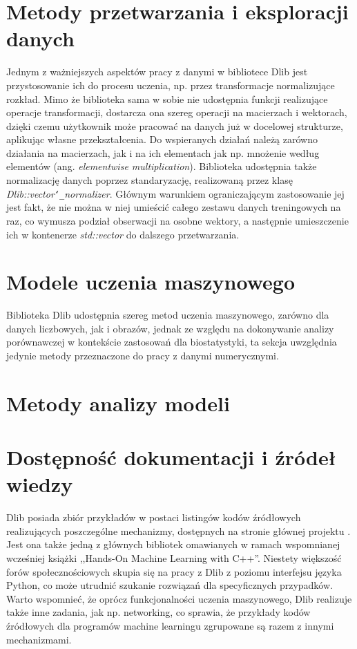 \section{Metody przetwarzania i eksploracji danych}

Jednym z ważniejszych aspektów pracy z danymi w bibliotece Dlib jest przystosowanie ich do procesu uczenia, np. przez transformacje normalizujące rozkład. Mimo że biblioteka sama w sobie nie udostępnia funkcji realizujące operacje transformacji, dostarcza ona szereg operacji na macierzach i wektorach, dzięki czemu użytkownik może pracować na danych już w docelowej strukturze, aplikując własne przekształcenia. Do wspieranych działań należą zarówno działania na macierzach, jak i na ich elementach jak np. mnożenie według elementów (ang. \textit{elementwise multiplication}). Biblioteka udostępnia także normalizację danych poprzez standaryzację, realizowaną przez klasę \textit{Dlib::vector\texttt{\char`_}normalizer}. Głównym warunkiem ograniczającym zastosowanie jej jest fakt, że nie można w niej umieścić całego zestawu danych treningowych na raz, co wymusza podział obserwacji na osobne wektory, a następnie umieszczenie ich w kontenerze \textit{std::vector} do dalszego przetwarzania.

\section{Modele uczenia maszynowego}

Biblioteka Dlib udostępnia szereg metod uczenia maszynowego, zarówno dla danych liczbowych, jak i obrazów, jednak ze względu na dokonywanie analizy porównawczej w kontekście zastosowań dla biostatystyki, ta sekcja uwzględnia jedynie metody przeznaczone do pracy z danymi numerycznymi.

\section{Metody analizy modeli}
\section{Dostępność dokumentacji i źródeł wiedzy}

Dlib posiada zbiór przykładów w postaci listingów kodów źródłowych realizujących poszczególne mechanizmy, dostępnych na stronie głównej projektu \cite{dlib:home}. Jest ona także jedną z głównych bibliotek omawianych w ramach wspomnianej wcześniej książki ,,Hands-On Machine Learning with C++''. Niestety większość forów społecznościowych skupia się na pracy z Dlib z poziomu interfejsu języka Python, co może utrudnić szukanie rozwiązań dla specyficznych przypadków. Warto wspomnieć, że oprócz funkcjonalności uczenia maszynowego, Dlib realizuje także inne zadania, jak np. networking, co sprawia, że przykłady kodów źródłowych dla programów machine learningu zgrupowane są razem z innymi mechanizmami. 

